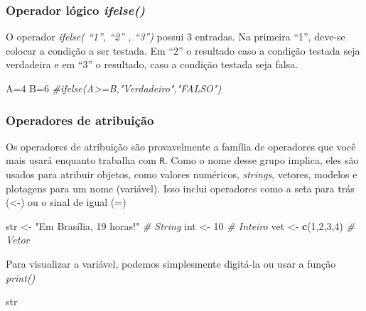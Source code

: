 \documentclass[
]{book}
\newenvironment{Shaded}{\begin{snugshade}}{\end{snugshade}}
\newcommand{\CommentTok}[1]{\textcolor[rgb]{0.56,0.35,0.01}{\textit{#1}}}
\newcommand{\DecValTok}[1]{\textcolor[rgb]{0.00,0.00,0.81}{#1}}
\newcommand{\KeywordTok}[1]{\textcolor[rgb]{0.13,0.29,0.53}{\textbf{#1}}}
\newcommand{\NormalTok}[1]{#1}
\newcommand{\StringTok}[1]{\textcolor[rgb]{0.31,0.60,0.02}{#1}}
\theoremstyle{definition}
\theoremstyle{definition}
\theoremstyle{definition}
\theoremstyle{remark}
\begin{document}
\hypertarget{operador-luxf3gico-ifelse}{%
\subsubsection{\texorpdfstring{Operador lógico \emph{ifelse()}}{Operador lógico ifelse()}}\label{operador-luxf3gico-ifelse}}

O operador \emph{ifelse( ``1'', ``2'' , ``3'')} possui 3 entradas. Na primeira ``1'', deve-se colocar a condição a ser testada. Em ``2'' o resultado caso a condição testada seja verdadeira e em ``3'' o resultado, caso a condição testada seja falsa.

\begin{Shaded}
\begin{Highlighting}[]
\NormalTok{A=}\DecValTok{4}
\NormalTok{B=}\DecValTok{6}
\CommentTok{#ifelse(A>=B,"Verdadeiro","FALSO")}
\end{Highlighting}
\end{Shaded}

\hypertarget{operadores-de-atribuiuxe7uxe3o}{%
\subsubsection{Operadores de atribuição}\label{operadores-de-atribuiuxe7uxe3o}}

Os operadores de atribuição são provavelmente a família de operadores que você mais usará enquanto
trabalha com \texttt{R}. Como o nome desse grupo implica, eles são usados para atribuir objetos, como
valores numéricos, \emph{strings}, vetores, modelos e plotagens para um nome (variável). Isso inclui
operadores como a seta para trás (\textless-) ou o sinal de igual (=)

\begin{Shaded}
\begin{Highlighting}[]
\NormalTok{str <-}\StringTok{ "Em Brasília, 19 horas!"} \CommentTok{# String}
\NormalTok{int <-}\StringTok{ }\DecValTok{10} \CommentTok{# Inteiro}
\NormalTok{vet <-}\StringTok{ }\KeywordTok{c}\NormalTok{(}\DecValTok{1}\NormalTok{,}\DecValTok{2}\NormalTok{,}\DecValTok{3}\NormalTok{,}\DecValTok{4}\NormalTok{) }\CommentTok{# Vetor}
\end{Highlighting}
\end{Shaded}

Para visualizar a variável, podemos simplesmente digitá-la ou usar a função \emph{print()}

\begin{Shaded}
\begin{Highlighting}[]
\NormalTok{str}
\end{Highlighting}
\end{Shaded}
\end{document}
